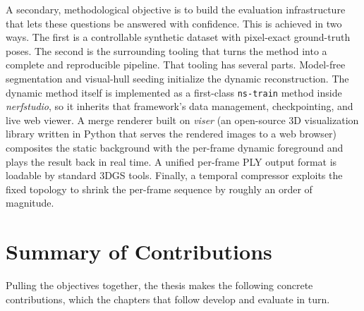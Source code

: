 A secondary, methodological objective is to build the evaluation infrastructure
that lets these questions be answered with confidence. This is achieved in two
ways. The first is a controllable synthetic dataset with pixel-exact
ground-truth poses. The second is the surrounding tooling that turns the method
into a complete and reproducible pipeline. That tooling has several parts.
Model-free segmentation and visual-hull seeding initialize the dynamic
reconstruction. The dynamic method itself is implemented as a first-class
\texttt{ns-train} method inside \emph{nerfstudio}, so it inherits that
framework's data management, checkpointing, and live web viewer. A merge
renderer built on \emph{viser} (an open-source 3D visualization library written
in Python that serves the rendered images to a web browser) composites the
static background with the per-frame dynamic foreground and plays the result
back in real time. A unified per-frame PLY output format is loadable by standard
3DGS tools. Finally, a temporal compressor exploits the fixed topology to shrink
the per-frame sequence by roughly an order of magnitude.

\section{Summary of Contributions}
\label{sec:contributions}

Pulling the objectives together, the thesis makes the following concrete
contributions, which the chapters that follow develop and evaluate in turn.

